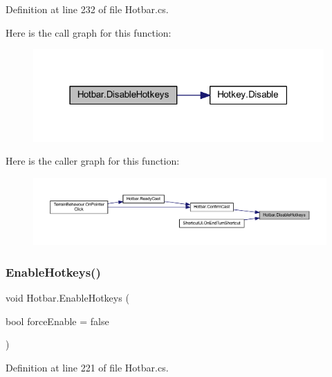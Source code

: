 Definition at line 232 of file Hotbar.\+cs.

Here is the call graph for this function\+:
\nopagebreak
\begin{figure}[H]
\begin{center}
\leavevmode
\includegraphics[width=315pt]{class_hotbar_a914ca0c61c4d64b0bde6e829064f71a9_cgraph}
\end{center}
\end{figure}
Here is the caller graph for this function\+:
\nopagebreak
\begin{figure}[H]
\begin{center}
\leavevmode
\includegraphics[width=350pt]{class_hotbar_a914ca0c61c4d64b0bde6e829064f71a9_icgraph}
\end{center}
\end{figure}
\mbox{\label{class_hotbar_a37bca03a1dfd144a30bae3774eaab667}} 
\subsubsection{\texorpdfstring{EnableHotkeys()}{EnableHotkeys()}}
{\footnotesize\ttfamily void Hotbar.\+Enable\+Hotkeys (\begin{DoxyParamCaption}\item[{bool}]{force\+Enable = {\ttfamily false} }\end{DoxyParamCaption})}



Definition at line 221 of file Hotbar.\+cs.

